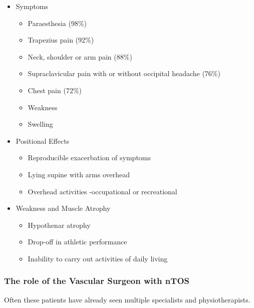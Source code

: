 \documentclass[
]{book}
\begin{document}
\begin{itemize}
\item
  Symptoms \citep{sadeghi-azandaryaniThoracicOutletSyndrome2009, sandersDiagnosisThoracicOutlet2007}

  \begin{itemize}
  \item
    Paraesthesia (98\%)
  \item
    Trapezius pain (92\%)
  \item
    Neck, shoulder or arm pain (88\%)
  \item
    Supraclavicular pain with or without occipital headache (76\%)
  \item
    Chest pain (72\%)
  \item
    Weakness
  \item
    Swelling
  \end{itemize}
\item
  Positional Effects

  \begin{itemize}
  \item
    Reproducible exacerbation of symptoms
  \item
    Lying supine with arms overhead
  \item
    Overhead activities -occupational or recreational
  \end{itemize}
\item
  Weakness and Muscle Atrophy

  \begin{itemize}
  \item
    Hypothenar atrophy
  \item
    Drop-off in athletic performance
  \item
    Inability to carry out activities of daily living~
  \end{itemize}
\end{itemize}

\hypertarget{the-role-of-the-vascular-surgeon-with-ntos}{%
\subsubsection{The role of the Vascular Surgeon with nTOS}\label{the-role-of-the-vascular-surgeon-with-ntos}}

Often these patients have already seen multiple specialists and
physiotherapists.
\end{document}
